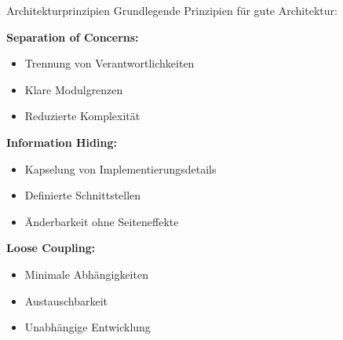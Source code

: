 \begin{concept}{Architekturprinzipien}
Grundlegende Prinzipien für gute Architektur:

\textbf{Separation of Concerns:}
\begin{itemize}
    \item Trennung von Verantwortlichkeiten
    \item Klare Modulgrenzen
    \item Reduzierte Komplexität
\end{itemize}

\textbf{Information Hiding:}
\begin{itemize}
    \item Kapselung von Implementierungsdetails
    \item Definierte Schnittstellen
    \item Änderbarkeit ohne Seiteneffekte
\end{itemize}

\textbf{Loose Coupling:}
\begin{itemize}
    \item Minimale Abhängigkeiten
    \item Austauschbarkeit
    \item Unabhängige Entwicklung
\end{itemize}
\end{concept}


